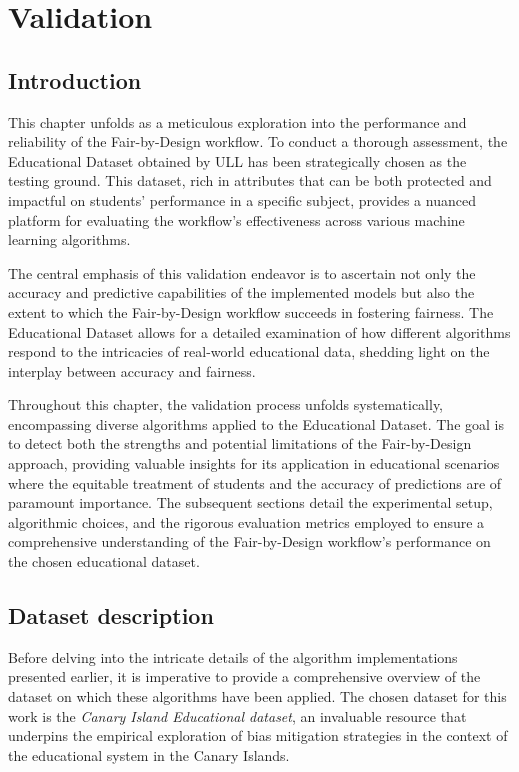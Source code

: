 \chapter{Validation}
\label{chap:validation}

\section{Introduction}
This chapter unfolds as a meticulous exploration into the performance and reliability of the Fair-by-Design workflow. To conduct a thorough assessment, the Educational Dataset obtained by ULL has been strategically chosen as the testing ground. This dataset, rich in attributes that can be both protected and impactful on students' performance in a specific subject, provides a nuanced platform for evaluating the workflow's effectiveness across various machine learning algorithms.

The central emphasis of this validation endeavor is to ascertain not only the accuracy and predictive capabilities of the implemented models but also the extent to which the Fair-by-Design workflow succeeds in fostering fairness. The Educational Dataset allows for a detailed examination of how different algorithms respond to the intricacies of real-world educational data, shedding light on the interplay between accuracy and fairness.

Throughout this chapter, the validation process unfolds systematically, encompassing diverse algorithms applied to the Educational Dataset. The goal is to detect both the strengths and potential limitations of the Fair-by-Design approach, providing valuable insights for its application in educational scenarios where the equitable treatment of students and the accuracy of predictions are of paramount importance. The subsequent sections detail the experimental setup, algorithmic choices, and the rigorous evaluation metrics employed to ensure a comprehensive understanding of the Fair-by-Design workflow's performance on the chosen educational dataset.

\section{Dataset description}

Before delving into the intricate details of the algorithm implementations presented earlier, it is imperative to provide a comprehensive overview of the dataset on which these algorithms have been applied. The chosen dataset for this work is the \emph{Canary Island Educational dataset}, an invaluable resource that underpins the empirical exploration of bias mitigation strategies in the context of the educational system in the Canary Islands. 


